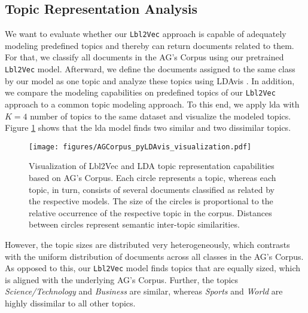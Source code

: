 \documentclass[a4paper,twoside]{article}
\begin{document}
\subsection{Topic Representation Analysis}
We want to evaluate whether our \texttt{Lbl2Vec} approach is capable of adequately modeling predefined topics and thereby can return documents related to them. For that, we classify all documents in the AG's Corpus using our pretrained \texttt{Lbl2Vec} model. Afterward, we define the documents assigned to the same class by our model as one topic and analyze these topics using LDAvis \citep{sievert-shirley-2014-ldavis}. In addition, we compare the modeling capabilities on predefined topics of our \texttt{Lbl2Vec} approach to a common topic modeling approach. To this end, we apply \ac{lda} \citep{lda} with $K=4$ number of topics to the same dataset and visualize the modeled topics. Figure \ref{fig:pyLDAvis_visualization} shows that the \ac{lda} model finds two similar and two dissimilar topics.
\begin{figure}[ht]
    \centering
    \texttt{[image: figures/AGCorpus\_pyLDAvis\_visualization.pdf]}
    \caption{Visualization of Lbl2Vec and LDA topic representation capabilities based on AG's Corpus. Each circle represents a topic, whereas each topic, in turn, consists of several documents classified as related by the respective models. The size of the circles is proportional to the relative occurrence of the respective topic in the corpus. Distances between circles represent semantic inter-topic similarities.}
    \label{fig:pyLDAvis_visualization}
\end{figure}
However, the topic sizes are distributed very heterogeneously, which contrasts with the uniform distribution of documents across all classes in the AG's Corpus. As opposed to this, our \texttt{Lbl2Vec} model finds topics that are equally sized, which is aligned with the underlying AG's Corpus. Further, the topics \textit{Science/Technology} and \textit{Business} are similar, whereas \textit{Sports} and \textit{World} are highly dissimilar to all other topics.
\end{document}
